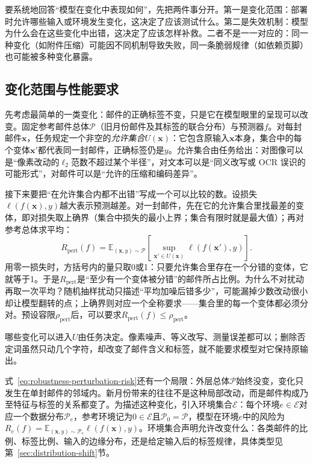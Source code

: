 要系统地回答“模型在变化中表现如何”，先把两件事分开。第一是变化范围：部署时允许哪些输入或环境发生变化，这决定了应该测试什么。第二是失效机制：模型为什么会在这些变化中出错，这决定了应该怎样补救。二者不是一一对应的：同一种变化（如附件压缩）可能因不同机制导致失败，同一条脆弱规律（如依赖页脚）也可能被多种变化暴露。

\subsection{变化范围与性能要求}
\label{sec:robustness-change-scope}

先考虑最简单的一类变化：邮件的正确标签不变，只是它在模型眼里的呈现可以改变。固定参考邮件总体$\mathcal P$（旧月份邮件及其标签的联合分布）与预测器$f$。对每封邮件$\bm{x}$，任务规定一个非空的\emph{允许集合}$U(\bm{x})$：它包含原输入$\bm{x}$本身，集合中的每个变体$\bm{x}'$都代表同一封邮件，正确标签仍是$y$。允许集合由任务给出：对图像可以是“像素改动的$\ell_2$范数不超过某个半径”，对文本可以是“同义改写或 OCR 误识的可能形式”，对邮件可以是“允许的压缩和编码差异”。

接下来要把“在允许集合内都不出错”写成一个可以比较的数。设损失$\ell(f(\bm{x}),y)$越大表示预测越差。对一封邮件，先在它的允许集合里找最差的变体，即对损失取上确界（集合中损失的最小上界；集合有限时就是最大值）；再对参考总体求平均：
\begin{equation}
 R_{\mathrm{pert}}(f)
 =\mathbb E_{(\bm{x},y)\sim\mathcal P}
   \left[\sup_{\bm{x}'\in U(\bm{x})}
   \ell(f(\bm{x}'),y)\right].
 \label{eq:robustness-perturbation-risk}
\end{equation}
用零一损失时，方括号内的量只取0或1：只要允许集合里存在一个分错的变体，它就等于1。于是$R_{\mathrm{pert}}$是“至少有一个变体被分错”的邮件所占比例。为什么不对扰动再取一次平均？随机抽样扰动只描述“平均加噪后错多少”，可能漏掉少数改动很小却让模型翻转的点；上确界则对应一个全称要求——集合里的每一个变体都必须分对。预设容限$\rho_{\mathrm{pert}}$后，可以要求$R_{\mathrm{pert}}(f)\leq\rho_{\mathrm{pert}}$。

哪些变化可以进入$U$由任务决定。像素噪声、等义改写、测量误差都可以；删除否定词虽然只动几个字符，却改变了邮件含义和标签，就不能要求模型对它保持原输出。

式~\eqref{eq:robustness-perturbation-risk}还有一个局限：外层总体$\mathcal P$始终没变，变化只发生在单封邮件的邻域内。新月份带来的往往不是这种局部改动，而是邮件构成乃至特征与标签的关系都变了。为描述这种变化，引入环境集合$\mathcal E$：每个环境$e\in\mathcal E$对应一个数据分布$\mathcal P_e$，参考环境记为$0\in\mathcal E$且$\mathcal P_0=\mathcal P$，模型在环境$e$中的风险为$R_e(f)=\mathbb E_{(\bm{x},y)\sim\mathcal P_e}\ell(f(\bm{x}),y)$。环境集合声明允许改变什么：各类邮件的比例、标签比例、输入的边缘分布，还是给定输入后的标签规律，具体类型见第~\ref{sec:distribution-shift}节。

